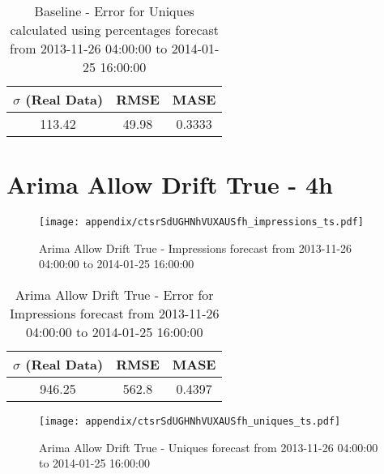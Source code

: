 \begin{table}[H]
\centering
\footnotesize
\begin{tabular}{ccc}
$\sigma$ (Real Data) & RMSE & MASE   \\ \hline
113.42 & 49.98 & 0.3333 \\
\end{tabular}

\vspace{0.5cm}

\caption{
Baseline - Error for Uniques calculated using percentages forecast from 2013-11-26 04:00:00 to 2014-01-25 16:00:00}
\end{table}

\section{Arima Allow Drift True - 4h}
\begin{figure}[H] \begin{center} \leavevmode
\texttt{[image: appendix/ctsrSdUGHNhVUXAUSfh\_impressions\_ts.pdf]} \caption{
Arima Allow Drift True - Impressions forecast from 2013-11-26 04:00:00 to 2014-01-25 16:00:00} \label{fig:appendix/ctsrSdUGHNhVUXAUSfh_impressions_ts.pdf} \end{center}
\end{figure}

\begin{table}[H]
\centering
\footnotesize
\begin{tabular}{ccc}
$\sigma$ (Real Data) & RMSE & MASE   \\ \hline
946.25 & 562.8 & 0.4397 \\
\end{tabular}

\vspace{0.5cm}

\caption{
Arima Allow Drift True - Error for Impressions forecast from 2013-11-26 04:00:00 to 2014-01-25 16:00:00}
\end{table}

\begin{figure}[H] \begin{center} \leavevmode
\texttt{[image: appendix/ctsrSdUGHNhVUXAUSfh\_uniques\_ts.pdf]} \caption{
Arima Allow Drift True - Uniques forecast from 2013-11-26 04:00:00 to 2014-01-25 16:00:00} \label{fig:appendix/ctsrSdUGHNhVUXAUSfh_uniques_ts.pdf} \end{center}
\end{figure}

